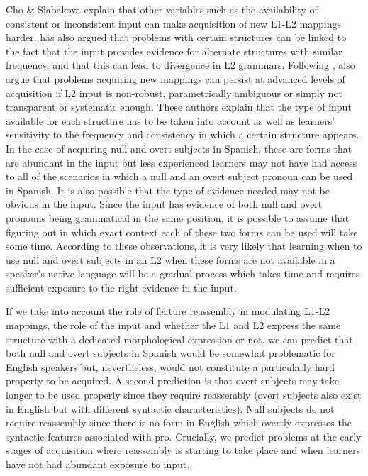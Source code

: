 \documentclass[output=paper]{langscibook}
\begin{document}
Cho \& Slabakova explain that other variables such as the availability of consistent or inconsistent input can make acquisition of new L1-L2 mappings harder. \citet{Slabakova2013} has also argued that problems with certain structures can be linked to the fact that the input provides evidence for alternate structures with similar frequency, and that this can lead to divergence in L2 grammars. Following \citet{Papp2000}, \citet{DominguezArche2008,DominguezArche2014} also argue that problems acquiring new mappings can persist at advanced levels of acquisition if L2 input is non-robust, parametrically ambiguous or simply not transparent or systematic enough. These authors explain that the type of input available for each structure has to be taken into account as well as learners’ sensitivity to the frequency and consistency in which a certain structure appears. In the case of acquiring null and overt subjects in Spanish, these are forms that are abundant in the input but less experienced learners may not have had access to all of the scenarios in which a null and an overt subject pronoun can be used in Spanish. It is also possible that the type of evidence needed may not be obvious in the input. Since the input has evidence of both null and overt pronouns being grammatical in the same position, it is possible to assume that figuring out in which exact context each of these two forms can be used will take some time. According to these observations, it is very likely that learning when to use null and overt subjects in an L2 when these forms are not available in a speaker’s native language will be a gradual process which takes time and requires sufficient exposure to the right evidence in the input.

If we take into account the role of feature reassembly in modulating L1-L2 mappings, the role of the input and whether the L1 and L2 express the same structure with a dedicated morphological expression or not, we can predict that both null and overt subjects in Spanish would be somewhat problematic for English speakers but, nevertheless, would not constitute a particularly hard property to be acquired. A second prediction is that overt subjects may take longer to be used properly since they require reassembly (overt subjects also exist in English but with different syntactic characteristics). Null subjects do not require reassembly since there is no form in English which overtly expresses the syntactic features associated with pro. Crucially, we predict problems at the early stages of acquisition where reassembly is starting to take place and when learners have not had abundant exposure to input.
\end{document}
